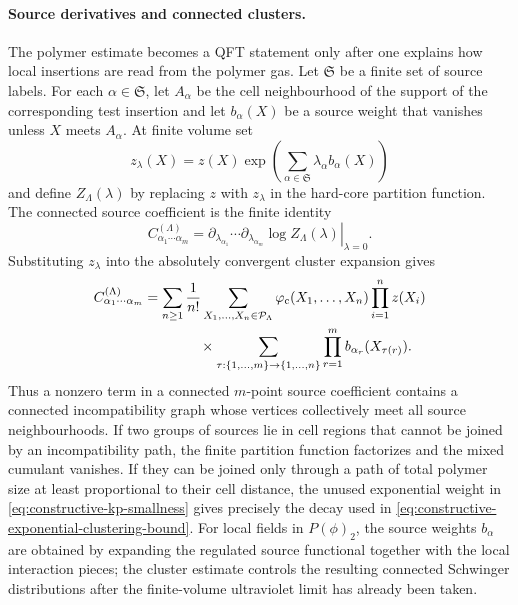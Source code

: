 \paragraph{Source derivatives and connected clusters.}
The polymer estimate becomes a QFT statement only after one explains how
local insertions are read from the polymer gas.  Let \(\mathfrak S\) be a
finite set of source labels.  For each \(\alpha\in\mathfrak S\), let
\(A_\alpha\) be the cell neighbourhood of the support of the corresponding
test insertion and let \(b_\alpha(X)\) be a source weight that vanishes unless
\(X\) meets \(A_\alpha\).  At finite volume set
\[
  z_\lambda(X)
  =
  z(X)\exp\!\left(
    \sum_{\alpha\in\mathfrak S}\lambda_\alpha b_\alpha(X)
  \right)
\]
and define \(Z_\Lambda(\lambda)\) by replacing \(z\) with \(z_\lambda\) in the
hard-core partition function.  The connected source coefficient is the finite
identity
\[
  C_{\alpha_1\cdots\alpha_m}^{(\Lambda)}
  =
  \left.
  \partial_{\lambda_{\alpha_1}}\cdots
  \partial_{\lambda_{\alpha_m}}\log Z_\Lambda(\lambda)
  \right|_{\lambda=0}.
\]
Substituting \(z_\lambda\) into the absolutely convergent cluster expansion
gives
\[
\begin{aligned}
  C_{\alpha_1\cdots\alpha_m}^{(\Lambda)}
  &=
  \sum_{n\geq1}\frac1{n!}
  \sum_{X_1,\ldots,X_n\in\mathcal P_\Lambda}
  \varphi_{\rm c}(X_1,\ldots,X_n)
  \prod_{i=1}^nz(X_i)                                      \\
  &\qquad\qquad\times
  \sum_{\tau:\{1,\ldots,m\}\to\{1,\ldots,n\}}
  \prod_{r=1}^m b_{\alpha_r}(X_{\tau(r)}).
\end{aligned}
\]
Thus a nonzero term in a connected \(m\)-point source coefficient contains a
connected incompatibility graph whose vertices collectively meet all source
neighbourhoods.  If two groups of sources lie in cell regions that cannot be
joined by an incompatibility path, the finite partition function factorizes
and the mixed cumulant vanishes.  If they can be joined only through a path of
total polymer size at least proportional to their cell distance, the unused
exponential weight in \eqref{eq:constructive-kp-smallness} gives precisely the
decay used in \eqref{eq:constructive-exponential-clustering-bound}.  For
local fields in \(P(\phi)_2\), the source weights \(b_\alpha\) are obtained by
expanding the regulated source functional together with the local interaction
pieces; the cluster estimate controls the resulting connected Schwinger
distributions after the finite-volume ultraviolet limit has already been
taken.


